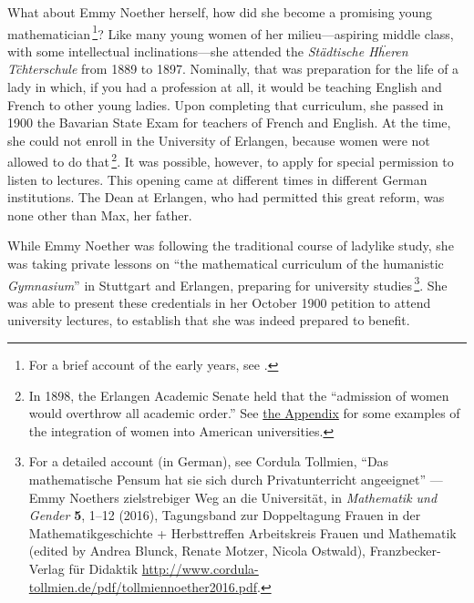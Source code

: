 \documentclass[twoside,symmetric]{tufte-handout}
\begin{document}
What about Emmy Noether herself, how did she become a promising young mathematician$\,$\footnote{For a brief account of the early years, see .}? Like many young women of her milieu---aspiring middle class, with some intellectual inclinations---she attended the \emph{Städtische H\"heren T\"chterschule} from 1889 to 1897. Nominally, that was preparation for the life of a lady in which, if you had a profession at all, it would be teaching English and French to other young ladies. Upon completing that curriculum, she passed in 1900 the Bavarian State Exam for teachers of French and English. At the time, she could not enroll in the University of Erlangen, because women were not allowed to do that$\,$\footnote{In 1898, the Erlangen Academic Senate held that the ``admission of women would overthrow all academic order.'' See \hyperref[app:women]{the Appendix} for some examples of the integration of women into American universities.}. It was possible, however, to apply for special permission to listen to lectures. This opening came at different times in different German institutions. The Dean at Erlangen, who had permitted this great reform, was none other than Max, her father.


While Emmy Noether was following the traditional course of ladylike study, she was taking private lessons on ``the mathematical curriculum of the humanistic \emph{Gymnasium}'' in Stuttgart and Erlangen, preparing for university studies$\,$\footnote{For a detailed account (in German), see Cordula Tollmien,
``Das mathematische Pensum hat sie sich durch Privatunterricht angeeignet'' --- Emmy Noethers zielstrebiger Weg an die Universität,  in \emph{Mathematik und Gender} \textbf{5}, 1--12 (2016), Tagungsband zur Doppeltagung Frauen in der Mathematikgeschichte + Herbsttreffen Arbeitskreis Frauen und Mathematik (edited by Andrea Blunck, Renate Motzer, Nicola Ostwald), Franzbecker-Verlag für Didaktik  \url{http://www.cordula-tollmien.de/pdf/tollmiennoether2016.pdf}.}.
She was able to present these credentials in her October 1900 petition to attend university lectures, to establish that she was indeed prepared to benefit.
\end{document}
